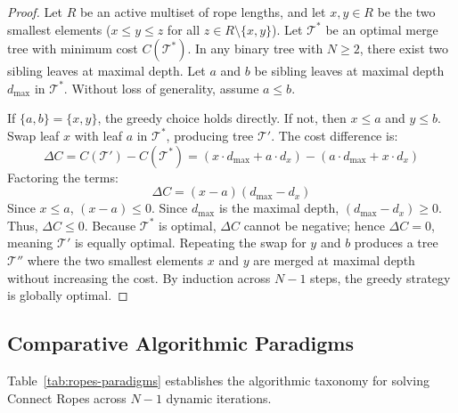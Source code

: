 \documentclass[10pt,twocolumn,letterpaper]{article}
\begin{document}
\begin{proof}
Let $R$ be an active multiset of rope lengths, and let $x, y \in R$ be the two smallest elements ($x \le y \le z$ for all $z \in R \setminus \{x, y\}$). Let $\mathcal{T}^*$ be an optimal merge tree with minimum cost $C(\mathcal{T}^*)$. In any binary tree with $N \ge 2$, there exist two sibling leaves at maximal depth. Let $a$ and $b$ be sibling leaves at maximal depth $d_{\max}$ in $\mathcal{T}^*$. Without loss of generality, assume $a \le b$. 

If $\{a, b\} = \{x, y\}$, the greedy choice holds directly. If not, then $x \le a$ and $y \le b$. Swap leaf $x$ with leaf $a$ in $\mathcal{T}^*$, producing tree $\mathcal{T}'$. The cost difference is:
\begin{equation}
\Delta C = C(\mathcal{T}') - C(\mathcal{T}^*) = (x \cdot d_{\max} + a \cdot d_x) - (a \cdot d_{\max} + x \cdot d_x)
\end{equation}
Factoring the terms:
\begin{equation}
\Delta C = (x - a)(d_{\max} - d_x)
\end{equation}
Since $x \le a$, $(x - a) \le 0$. Since $d_{\max}$ is the maximal depth, $(d_{\max} - d_x) \ge 0$. Thus, $\Delta C \le 0$. Because $\mathcal{T}^*$ is optimal, $\Delta C$ cannot be negative; hence $\Delta C = 0$, meaning $\mathcal{T}'$ is equally optimal. Repeating the swap for $y$ and $b$ produces a tree $\mathcal{T}''$ where the two smallest elements $x$ and $y$ are merged at maximal depth without increasing the cost. By induction across $N-1$ steps, the greedy strategy is globally optimal.
\end{proof}

\subsection{Comparative Algorithmic Paradigms}
Table~\ref{tab:ropes-paradigms} establishes the algorithmic taxonomy for solving Connect Ropes across $N-1$ dynamic iterations.

\begin{table}[htbp]
\centering
\caption{Taxonomy of Algorithmic Paradigms for Connect Ropes}
\label{tab:ropes-paradigms}
\end{table}
\end{document}
